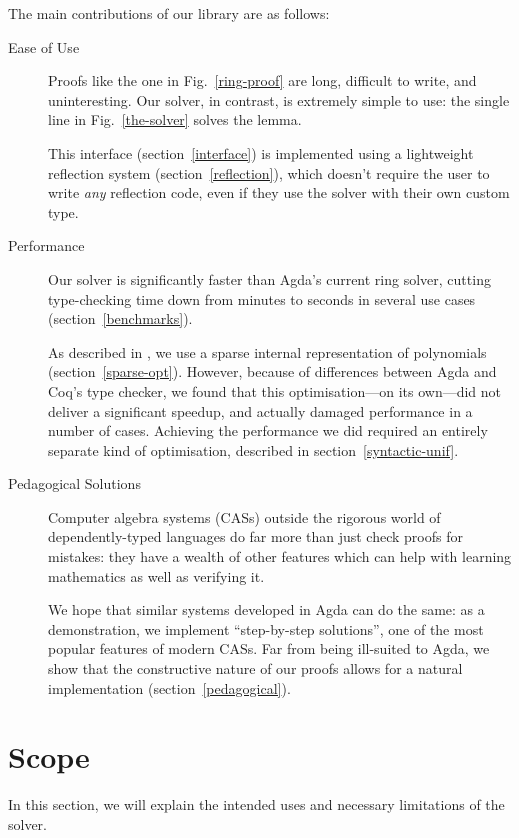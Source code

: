 \documentclass[acmsmall]{acmart}\settopmatter{printfolios=true,printccs=false,printacmref=false}
\theoremstyle{remark}
\begin{document}
The main contributions of our library are as follows:
\begin{description}
  \item[Ease of Use] Proofs like the one in Fig.~\ref{ring-proof} are long,
    difficult to write, and uninteresting. Our solver, in contrast, is extremely
    simple to use: the single line in Fig.~\ref{the-solver} solves the lemma.

    This interface (section~\ref{interface}) is implemented using a lightweight
    reflection system (section~\ref{reflection}), which doesn't require the user
    to write \emph{any} reflection code, even if they use the solver with their
    own custom type. 
  \item[Performance] Our solver is significantly faster than Agda's current ring
    solver, cutting type-checking time down from minutes to seconds in several
    use cases (section~\ref{benchmarks}).

    As described in \citet{gregoire_proving_2005}, we use a sparse internal
    representation of polynomials (section~\ref{sparse-opt}). However, because
    of differences between Agda and Coq's type checker, we found that this
    optimisation---on its own---did not deliver a significant speedup, and
    actually damaged performance in a number of cases. Achieving the performance
    we did required an entirely separate kind of optimisation, described in
    section~\ref{syntactic-unif}.
  \item[Pedagogical Solutions] Computer algebra systems (CASs) outside the
    rigorous world of dependently-typed languages do far more than just check
    proofs for mistakes: they have a wealth of other features which can help
    with learning mathematics as well as verifying it.

    We hope that similar systems developed in Agda can do the same: as a
    demonstration, we implement ``step-by-step solutions'', one of the most
    popular features of modern CASs. Far from being ill-suited to Agda, we show
    that the constructive nature of our proofs allows for a natural
    implementation (section~\ref{pedagogical}).
\end{description}
\section{Scope}
In this section, we will explain the intended uses and necessary limitations of
the solver.
\end{document}
